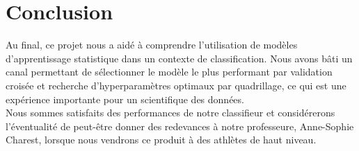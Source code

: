 \section{Conclusion}
Au final, ce projet nous a aidé à comprendre l’utilisation de modèles d’apprentissage statistique dans un contexte de classification. Nous avons bâti un canal permettant de sélectionner le modèle le plus performant par validation croisée et recherche d’hyperparamètres optimaux par quadrillage, ce qui est une expérience importante pour un scientifique des données.\\

Nous sommes satisfaits des performances de notre classifieur et considérerons l'éventualité de peut-être donner des redevances à notre professeure, Anne-Sophie Charest, lorsque nous vendrons ce produit à des athlètes de haut niveau.